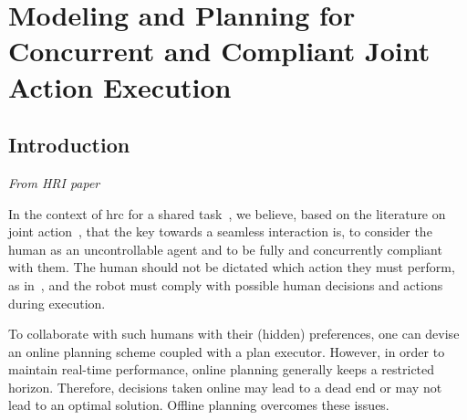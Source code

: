 \ifdefined{}
\else
\setcounter{chapter}{3} %
\dominitoc
\faketableofcontents
\fi

\chapter{Modeling and Planning for Concurrent and Compliant Joint Action Execution}
\label{chap:4}
\minitoc


\section{Introduction}

\textit{From HRI paper}

In the context of \acrshort{hrc} for a shared task~\cite{selvaggio2021autonomy}, we believe, based on the literature on joint action~\cite{sebanz_2006joint,sebanz-2009,clodic-2017,gordon-2023}, that the key towards a seamless interaction is, to consider the human as an uncontrollable agent and to be fully and concurrently compliant with them. 
The human should not be dictated which action they must perform, as in~\cite{roncone2017transparent,buisan_hatpehda_icra}, and the robot must comply with possible human decisions and actions during execution.

To collaborate with such humans with their (hidden) preferences, one can devise an online planning scheme coupled with a plan executor. 
However, in order to maintain real-time performance, online planning generally keeps a restricted horizon. 
Therefore, decisions taken online may lead to a dead end or may not lead to an optimal solution. 
Offline planning overcomes these issues. 

